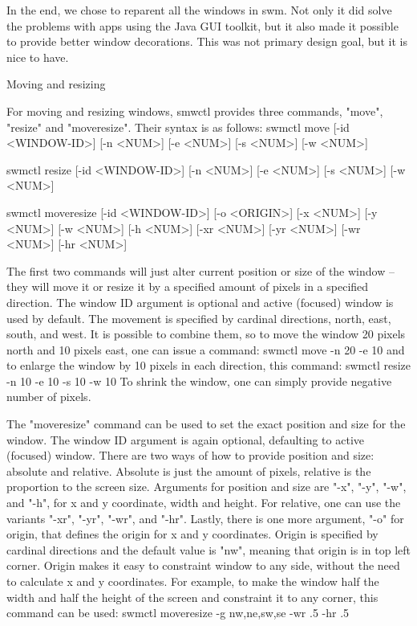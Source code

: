 In the end, we chose to reparent all the windows in swm.
Not only it did solve the problems with apps using the Java GUI toolkit, but it also made it possible to provide better window decorations.
This was not primary design goal, but it is nice to have.

\secc Moving and resizing %

For moving and resizing windows, smwctl provides three commands, "move", "resize" and "moveresize". Their syntax is as follows:
\begtt
swmctl move [-id <WINDOW-ID>]
            [-n <NUM>] [-e <NUM>] [-s <NUM>] [-w <NUM>]

swmctl resize [-id <WINDOW-ID>]
              [-n <NUM>] [-e <NUM>] [-s <NUM>] [-w <NUM>]

swmctl moveresize  [-id <WINDOW-ID>]
                   [-o <ORIGIN>]
                   [-x <NUM>] [-y <NUM>] [-w <NUM>] [-h <NUM>]
                   [-xr <NUM>] [-yr <NUM>] [-wr <NUM>] [-hr <NUM>]
\endtt

The first two commands will just alter current position or size of the window -- they will move it or resize it by a specified amount
of pixels in a specified direction.
The window ID argument is optional and active (focused) window is used by default.
The movement is specified by cardinal directions, {\sbf n}orth, {\sbf e}ast, {\sbf s}outh, and {\sbf w}est.
It is possible to combine them, so to move the window 20 pixels north and 10 pixels east, one can issue a command:
\begtt swmctl move -n 20 -e 10 \endtt
and to enlarge the window by 10 pixels in each direction, this command:
\begtt swmctl resize -n 10 -e 10 -s 10 -w 10 \endtt
To shrink the window, one can simply provide negative number of pixels.

The "moveresize" command can be used to set the exact position and size for the window.
The window ID argument is again optional, defaulting to active (focused) window.
There are two ways of how to provide position and size: absolute and relative.
Absolute is just the amount of pixels, relative is the proportion to the screen size.
Arguments for position and size are "-x", "-y", "-w", and "-h", for x and y coordinate, width and height.
For relative, one can use the variants "-xr", "-yr", "-wr", and "-hr".
Lastly, there is one more argument, "-o" for origin, that defines the origin for x and y coordinates.
Origin is specified by cardinal directions and the default value is "nw", meaning that origin is in top left corner.
Origin makes it easy to constraint window to any side, without the need to calculate x and y coordinates.
For example, to make the window half the width and half the height of the screen and constraint it to any corner, this command can be used:
\begtt swmctl moveresize -g {nw,ne,sw,se} -wr .5 -hr .5 \endtt

